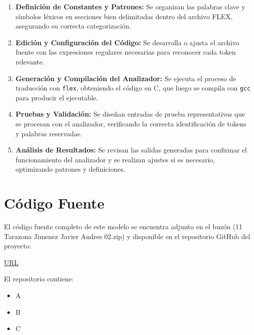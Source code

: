 \documentclass{article}
\begin{document}
\begin{enumerate}
    \item \textbf{Definición de Constantes y Patrones:} Se organizan las palabras clave y símbolos léxicos en secciones bien delimitadas dentro del archivo FLEX, asegurando su correcta categorización.
    \item \textbf{Edición y Configuración del Código:} Se desarrolla o ajusta el archivo fuente con las expresiones regulares necesarias para reconocer cada token relevante.
    \item \textbf{Generación y Compilación del Analizador:} Se ejecuta el proceso de traducción con \texttt{flex}, obteniendo el código en C, que luego se compila con \texttt{gcc} para producir el ejecutable.
    \item \textbf{Pruebas y Validación:} Se diseñan entradas de prueba representativas que se procesan con el analizador, verificando la correcta identificación de tokens y palabras reservadas.
    \item \textbf{Análisis de Resultados:} Se revisan las salidas generadas para confirmar el funcionamiento del analizador y se realizan ajustes si es necesario, optimizando patrones y definiciones.
\end{enumerate}



\section{Código Fuente}\label{sec:cod}

El código fuente completo de este modelo se encuentra adjunto en el buzón 
(11 Tarazona Jimenez Javier Andres 02.zip)
y disponible en el repositorio GitHub del proyecto:

\begin{center}
\url{URL}
\end{center}

El repositorio contiene:
\begin{itemize}
\item A
\item B
\item C
\end{itemize}

\end{document}
